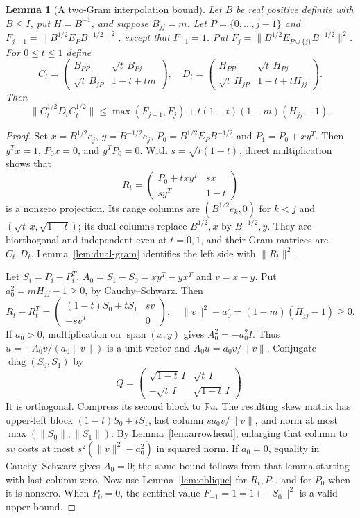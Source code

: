 \documentclass[reqno,a4paper,12pt]{amsart}
\newtheorem{lemma}[theorem]{Lemma}
\theoremstyle{definition}
\newcommand{\R}{\mathbb R}
\newcommand{\spn}{\operatorname{span}}
\newcommand{\diag}{\operatorname{diag}}
\begin{document}
\begin{lemma}[A two-Gram interpolation bound]\label{lem:row-matrix}
Let $B$ be real positive definite with $B\le I$, put $H=B^{-1}$,
and suppose $B_{jj}=m$. Let $P=\{0,\ldots,j-1\}$ and
$F_{j-1}=\|B^{1/2}E_PB^{-1/2}\|^2$, except that $F_{-1}=1$.
Put $F_j=\|B^{1/2}E_{P\cup\{j\}}B^{-1/2}\|^2$.
For $0\le t\le1$ define
\[
 C_t=\begin{pmatrix}B_{PP}&\sqrt t\,B_{Pj}\\
 \sqrt t\,B_{jP}&1-t+tm\end{pmatrix},\quad
 D_t=\begin{pmatrix}H_{PP}&\sqrt t\,H_{Pj}\\
 \sqrt t\,H_{jP}&1-t+tH_{jj}\end{pmatrix}.
\]
Then
\[
 \|C_t^{1/2}D_tC_t^{1/2}\|
 \le\max(F_{j-1},F_j)+t(1-t)(1-m)(H_{jj}-1).
\]
\end{lemma}
\begin{proof}
Set $x=B^{1/2}e_j$, $y=B^{-1/2}e_j$,
$P_0=B^{1/2}E_PB^{-1/2}$ and $P_1=P_0+xy^T$.
Then $y^Tx=1$, $P_0x=0$, and $y^TP_0=0$.
With $s=\sqrt{t(1-t)}$, direct multiplication shows that
\[
 R_t=\begin{pmatrix}P_0+txy^T&sx\\sy^T&1-t\end{pmatrix}
\]
is a nonzero projection. Its range columns are
$(B^{1/2}e_k,0)$ for $k<j$ and $(\sqrt t\,x,\sqrt{1-t})$;
its dual columns replace $B^{1/2},x$ by $B^{-1/2},y$.
They are biorthogonal and independent even at $t=0,1$, and their
Gram matrices are $C_t,D_t$. Lemma~\ref{lem:dual-gram} identifies
the left side with $\|R_t\|^2$.

Let $S_i=P_i-P_i^T$, $A_0=S_1-S_0=xy^T-yx^T$ and $v=x-y$.
Put $a_0^2=mH_{jj}-1\ge0$, by Cauchy--Schwarz. Then
\[
 R_t-R_t^T=
 \begin{pmatrix}(1-t)S_0+tS_1&sv\\-sv^T&0\end{pmatrix},
 \quad
 \|v\|^2-a_0^2=(1-m)(H_{jj}-1)\ge0.
\]
If $a_0>0$, multiplication on $\spn(x,y)$ gives $A_0^2=-a_0^2I$.
Thus $u=-A_0v/(a_0\|v\|)$ is a unit vector and
$A_0u=a_0v/\|v\|$.
Conjugate $\diag(S_0,S_1)$ by
\[
 Q=\begin{pmatrix}\sqrt{1-t}\,I&\sqrt t\,I\\
 -\sqrt t\,I&\sqrt{1-t}\,I\end{pmatrix}.
\]
It is orthogonal. Compress its second block to $\R u$.
The resulting skew matrix has upper-left block $(1-t)S_0+tS_1$,
last column $sa_0v/\|v\|$, and norm at most
$\max(\|S_0\|,\|S_1\|)$.
By Lemma~\ref{lem:arrowhead}, enlarging that column to $sv$ costs
at most $s^2(\|v\|^2-a_0^2)$ in squared norm.
If $a_0=0$, equality in Cauchy--Schwarz gives $A_0=0$;
the same bound follows from that lemma starting with last column zero.
Now use Lemma~\ref{lem:oblique} for $R_t,P_1$, and for $P_0$ when
it is nonzero. When $P_0=0$, the sentinel value
$F_{-1}=1=1+\|S_0\|^2$ is a valid upper bound.
\end{proof}
\end{document}

